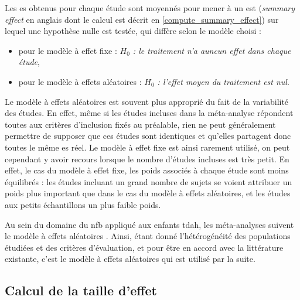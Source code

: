 Les \gls{es} obtenus pour chaque étude sont moyennés pour mener à un \gls{est} (\textit{summary effect} en anglais dont le calcul est
décrit en \ref{compute_summary_effect}) sur lequel une hypothèse nulle est testée, qui diffère selon le modèle choisi :
\begin{itemize}
\item pour le modèle à effet fixe : 
\textit{$H_{0}$ : le traitement n'a auncun effet dans chaque étude},
\item pour le modèle à effets aléatoires : 
\textit{$H_{0}$ : l'effet moyen du traitement est nul}.
\end{itemize}

Le modèle à effets aléatoires est souvent plus approprié du fait de la variabilité des études. En effet, même si les études incluses dans la méta-analyse 
répondent toutes aux critères d'inclusion fixés au préalable, rien ne peut généralement permettre de supposer que ces études sont identiques et qu'elles 
partagent donc toutes le même \gls{es} réel. Le modèle à effet fixe est ainsi rarement utilisé, on peut cependant y avoir recours lorsque le nombre d'études incluses 
est très petit. En effet, le cas du modèle à effet fixe, les poids associés à chaque étude sont moins équilibrés : les études incluant un grand nombre de 
sujets se voient attribuer un poids plus important que dans le cas du modèle à effets aléatoires, et les études aux petits échantillons un plus faible poids.

Au sein du domaine du \gls{nfb} appliqué aux enfants \gls{tdah}, les méta-analyses suivent le modèle à effets aléatoires 
\citep{Cortese2016, Micoulaud2014}. Ainsi, étant donné l'hétérogénéité des populations étudiées et des critères d'évaluation, et pour être en accord avec
la littérature existante, c'est le modèle à effets aléatoires qui est utilisé par la suite.

\subsection{Calcul de la taille d'effet} \label{definition_es}

